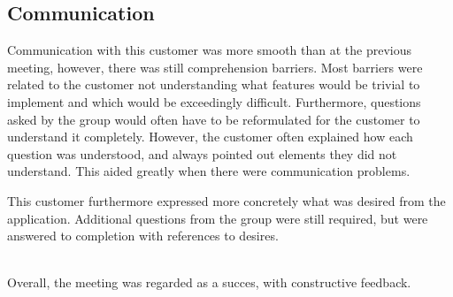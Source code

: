 \subsection{Communication}
Communication with this customer was more smooth than at the previous meeting, however, there was still comprehension barriers.
Most barriers were related to the customer not understanding what features would be trivial to implement and which would be exceedingly difficult.
Furthermore, questions asked by the group would often have to be reformulated for the customer to understand it completely.
However, the customer often explained how each question was understood, and always pointed out elements they did not understand.
This aided greatly when there were communication problems.

This customer furthermore expressed more concretely what was desired from the application.
Additional questions from the group were still required, but were answered to completion with references to desires.

\mbox{}\\
Overall, the meeting was regarded as a succes, with constructive feedback.